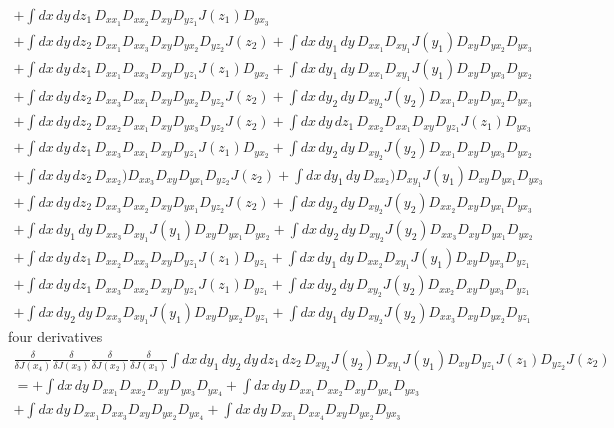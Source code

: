 \documentclass[10pt,a4paper]{article}
\theoremstyle{definition}
\begin{document}
\begin{enumerate}[1)]
\begin{align}
+\int dx\,dy\,dz_1\,D_{xx_1}D_{xx_2} D_{xy}D_{yz_1}J(z_1)D_{yx_3}\\
%
+\int dx\,dy\,dz_2\,D_{xx_1}D_{xx_3} D_{xy}D_{yx_2}D_{yz_2}J(z_2)
+\int dx\,dy_1\,dy\,D_{xx_1}D_{xy_1}J(y_1) D_{xy}D_{yx_2}D_{yx_3}\\
%
+\int dx\,dy\,dz_1\,D_{xx_1}D_{xx_3} D_{xy}D_{yz_1}J(z_1)D_{yx_2}
+\int dx\,dy_1\,dy\,D_{xx_1}D_{xy_1}J(y_1) D_{xy}D_{yx_3}D_{yx_2}\\
%
+\int dx\,dy\,dz_2\,D_{xx_3}D_{xx_1} D_{xy}D_{yx_2}D_{yz_2}J(z_2)
+\int dx\,dy_2\,dy\,D_{xy_2}J(y_2)D_{xx_1} D_{xy}D_{yx_2}D_{yx_3}\\
%
+\int dx\,dy\,dz_2\,D_{xx_2}D_{xx_1} D_{xy}D_{yx_3}D_{yz_2}J(z_2)
+\int dx\,dy\,dz_1\,D_{xx_2}D_{xx_1} D_{xy}D_{yz_1}J(z_1)D_{yx_3}\\
%
+\int dx\,dy\,dz_1\,D_{xx_3}D_{xx_1} D_{xy}D_{yz_1}J(z_1)D_{yx_2}
+\int dx\,dy_2\,dy\,D_{xy_2}J(y_2)D_{xx_1} D_{xy}D_{yx_3}D_{yx_2}\\
%
+\int dx\,dy\,dz_2\,D_{xx_2})D_{xx_3} D_{xy}D_{yx_1}D_{yz_2}J(z_2)
+\int dx\,dy_1\,dy\,D_{xx_2})D_{xy_1}J(y_1) D_{xy}D_{yx_1}D_{yx_3}\\
%
+\int dx\,dy\,dz_2\,D_{xx_3}D_{xx_2} D_{xy}D_{yx_1}D_{yz_2}J(z_2)
+\int dx\,dy_2\,dy\,D_{xy_2}J(y_2)D_{xx_2} D_{xy}D_{yx_1}D_{yx_3}\\
%
+\int dx\,dy_1\,dy\,D_{xx_3}D_{xy_1}J(y_1) D_{xy}D_{yx_1}D_{yx_2}
+\int dx\,dy_2\,dy\,D_{xy_2}J(y_2)D_{xx_3}D_{xy}D_{yx_1}D_{yx_2}\\
%
+\int dx\,dy\,dz_1\,D_{xx_2}D_{xx_3} D_{xy}D_{yz_1}J(z_1)D_{yz_1}
+\int dx\,dy_1\,dy\,D_{xx_2}D_{xy_1}J(y_1) D_{xy}D_{yx_3}D_{yz_1}\\
%
+\int dx\,dy\,dz_1\,D_{xx_3}D_{xx_2} D_{xy}D_{yz_1}J(z_1)D_{yz_1}
+\int dx\,dy_2\,dy\,D_{xy_2}J(y_2)D_{xx_2} D_{xy}D_{yx_3}D_{yz_1}\\
%
+\int dx\,dy_2\,dy\,D_{xx_3}D_{xy_1}J(y_1) D_{xy}D_{yx_2}D_{yz_1}
+\int dx\,dy_1\,dy\,D_{xy_2}J(y_2)D_{xx_3} D_{xy}D_{yx_2}D_{yz_1}
\end{align}
four derivatives
\begin{align}
\frac{\delta}{\delta J(x_4)}\frac{\delta}{\delta J(x_3)}\frac{\delta}{\delta J(x_2)}\frac{\delta}{\delta J(x_1)}\int dx\,dy_1\,dy_2\,dy\,dz_1\,dz_2\,D_{xy_2}J(y_2)D_{xy_1}J(y_1) D_{xy}D_{yz_1}J(z_1)D_{yz_2}J(z_2)\\
=+\int dx\,dy\,D_{xx_1}D_{xx_2} D_{xy}D_{yx_3}D_{yx_4}
+\int dx\,dy\,D_{xx_1}D_{xx_2} D_{xy}D_{yx_4}D_{yx_3}\\
%
+\int dx\,dy\,D_{xx_1}D_{xx_3} D_{xy}D_{yx_2}D_{yx_4}
+\int dx\,dy\,D_{xx_1}D_{xx_4} D_{xy}D_{yx_2}D_{yx_3}\\

\end{align}
\end{enumerate}
\end{document}
